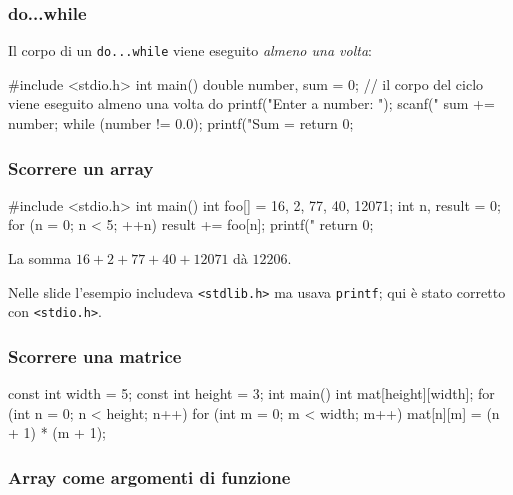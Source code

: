\documentclass[11pt,a4paper]{article}
\begin{document}
\subsubsection{do...while}

Il corpo di un \lstinline|do...while| viene eseguito \emph{almeno una volta}:
\begin{codice}
#include <stdio.h>
int main() {
    double number, sum = 0;
    // il corpo del ciclo viene eseguito almeno una volta
    do {
        printf("Enter a number: ");
        scanf("%
        sum += number;
    } while (number != 0.0);
    printf("Sum = %
    return 0;
}
\end{codice}

\subsubsection{Scorrere un array}

\begin{codice}
#include <stdio.h>
int main() {
    int foo[] = {16, 2, 77, 40, 12071};
    int n, result = 0;
    for (n = 0; n < 5; ++n) {
        result += foo[n];
    }
    printf("%
    return 0;
}
\end{codice}
La somma $16 + 2 + 77 + 40 + 12071$ dà $12206$.

\begin{osservazione}
Nelle slide l'esempio includeva \lstinline|<stdlib.h>| ma usava \lstinline|printf|; qui è stato corretto con \lstinline|<stdio.h>|.
\end{osservazione}

\subsubsection{Scorrere una matrice}

\begin{codice}
const int width = 5;
const int height = 3;
int main() {
    int mat[height][width];
    for (int n = 0; n < height; n++)
        for (int m = 0; m < width; m++)
            mat[n][m] = (n + 1) * (m + 1);
}
\end{codice}

\subsubsection{Array come argomenti di funzione}
\end{document}
